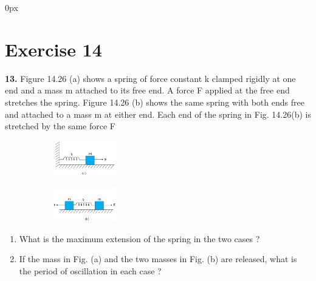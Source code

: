 \documentclass[journal,12pt,twocolumn]{IEEEtran}
\begin{document}
\parindent 0px


\vspace{3cm}

\title{}
\author{EE23BTECH11042 -  Khusinadha Naik$^{*}$
}
\maketitle
\newpage
\bigskip



\section*{Exercise 14}

\noindent \textbf{13.} \hspace{2pt}Figure 14.26 (a) shows a spring of force constant k clamped rigidly at one end and a mass m attached to its free end. A force F applied at the free end stretches the spring. Figure 14.26 (b) shows the same spring with both ends free and attached to a mass m at either end. Each end of the spring in Fig. 14.26(b) is stretched by the same force F


\begin{figure}[htbp]
    \centering
    \begin{subfigure}{\linewidth}
        \centering
        \includegraphics[width=0.3\textwidth]{ncert-physics/11/14/13/figs/fig1.png}

    \end{subfigure}
    \begin{subfigure}{\linewidth}
        \centering
        \includegraphics[width=0.3\textwidth]{ncert-physics/11/14/13/figs/fig2.png}

    \end{subfigure}
\end{figure}

\begin{enumerate}[label = (\alph*)]
	\item What is the maximum extension of the spring in the two cases ?		
	\item If the mass in Fig. (a) and the two masses in Fig. (b) are released, what is the
period of oscillation in each case ?
\end{enumerate}


\end{document}
